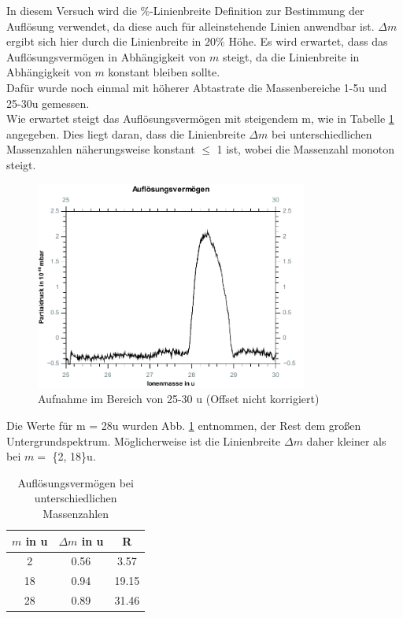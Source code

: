 In diesem Versuch wird die \%-Linienbreite Definition zur Bestimmung der Auflösung verwendet, da diese auch für alleinstehende Linien anwendbar ist. $\Delta m$ ergibt sich hier durch die Linienbreite in $20\%$ Höhe. Es wird erwartet, dass das Auflösungsvermögen in Abhängigkeit von $m$ steigt, da die Linienbreite in Abhängigkeit von $m$ konstant bleiben sollte.\\
Dafür wurde noch einmal mit höherer Abtastrate die Massenbereiche 1-5\;u und 25-30\;u gemessen.\\
Wie erwartet steigt das Auflösungsvermögen mit steigendem m, wie in Tabelle \ref{tab:a1_m} angegeben. Dies liegt daran, dass die Linienbreite $\Delta m$ bei unterschiedlichen Massenzahlen näherungsweise konstant $\leq$ 1 ist, wobei die Massenzahl monoton steigt.\\
\begin{figure}[h]
	\centering\includegraphics[width=0.8\textwidth]{fig/aufloesung}
	\caption{Aufnahme im Bereich von 25-30 u (Offset nicht korrigiert)}
	\label{fig:aufloesung}
\end{figure}
Die Werte für m = 28\;u wurden Abb. \ref{fig:aufloesung} entnommen, der Rest dem großen Untergrundspektrum. Möglicherweise ist die Linienbreite $\Delta m$ daher kleiner als bei $m =$ \{2, 18\}\;u.
\begin{table}
	\centering
	\caption{Auflösungsvermögen bei unterschiedlichen Massenzahlen}
	\begin{tabular}{ccc}
		\toprule
		$m$ in u&$\Delta m$ in u&R\\
		\midrule
		2&0.56&3.57\\
		18&0.94&19.15\\
		28&0.89&31.46\\
		\bottomrule
	\end{tabular}
	\label{tab:a1_m}
\end{table}

